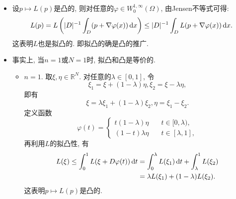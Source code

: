 \begin{itemize}
    \item 设$p \mapsto L(p)$是凸的, 则对任意的$\varphi \in W_0^{1, \infty}(\Omega)$, 由Jensen不等式可得: 
    \begin{align*}
        L(p) = L\left(|D|^{-1}\int_D(p + \nabla \varphi(x)) \,{\rm d}x\right) \leq |D|^{-1}\int_DL(p + \nabla\varphi(x)) \,{\rm d}x.
    \end{align*}
    这表明$L$也是拟凸的. 即拟凸的确是凸的推广.
    \item 事实上, 当$n = 1$或$N = 1$时, 拟凸和凸是等价的.
    \begin{itemize}
        \item $n = 1$. 取$\xi, \eta \in \mathbb{R}^N$. 对任意的$\lambda \in [0, 1]$, 令 
        \begin{equation*}
            \xi_1 = \xi + (1 - \lambda)\eta, \xi_2 = \xi - \lambda\eta,
        \end{equation*}
        即有 
        \begin{equation*}
            \xi = \lambda\xi_1 + (1 - \lambda)\xi_2, \eta = \xi_1 - \xi_2.
        \end{equation*}
        定义函数 
        \begin{equation*}
            \varphi(t) = 
            \begin{cases}
                t(1 - \lambda)\eta \quad &t \in [0, \lambda), \\ 
                (1 - t)\lambda\eta \quad &t \in [\lambda, 1],
            \end{cases}
        \end{equation*}
        再利用$L$的拟凸性, 有 
        \begin{align*}
            L(\xi) \leq \int_0^1L(\xi + D\varphi(t)) \,{\rm d}t &= \int_0^{\lambda}L(\xi_1) \,{\rm d}t + \int_{\lambda}^1L(\xi_2) \\
            &= \lambda L(\xi_1) + (1 - \lambda)L(\xi_2).
        \end{align*}
        这表明$p \mapsto L(p)$是凸的.
    \end{itemize}
\end{itemize}

